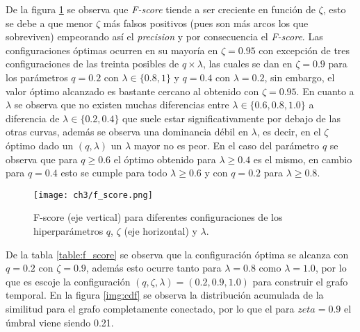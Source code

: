 \documentclass[letterpaper,12pt,oneside]{book} %
\begin{document}
De la figura \ref{img:f_score} se observa que \textit{F-score} tiende a ser creciente en función de $\zeta$, esto se debe a que menor $\zeta$ más falsos positivos (pues son más arcos los que sobreviven) empeorando así el \textit{precision} y por consecuencia el \textit{F-score}. Las configuraciones óptimas ocurren en su mayoría en $\zeta=0.95$ con excepción de tres configuraciones de las treinta posibles de $q\times \lambda$, las cuales se dan en $\zeta=0.9$ para los parámetros $q=0.2$ con $\lambda \in \{0.8, 1\}$ y $q=0.4$ con $\lambda=0.2$, sin embargo, el valor óptimo alcanzado es bastante cercano al obtenido con $\zeta=0.95$. En cuanto a $\lambda$ se observa que no existen muchas diferencias entre $\lambda\in\{0.6, 0.8, 1.0\}$ a diferencia de $\lambda \in \{0.2, 0.4\}$ que suele estar significativamente por debajo de las otras curvas, además se observa una dominancia débil en $\lambda$, es decir, en el $\zeta$ óptimo dado un $(q, \lambda)$ un $\lambda$ mayor no es peor. En el caso del parámetro $q$ se observa que para $q\geq 0.6$ el óptimo obtenido para $\lambda\geq 0.4$ es el mismo, en cambio para $q=0.4$ esto se cumple para todo $\lambda\geq 0.6$ y con $q=0.2$ para $\lambda \geq 0.8$. 

\begin{figure}
    \centering
    \texttt{[image: ch3/f\_score.png]}
    \caption{F-score (eje vertical) para diferentes configuraciones de los hiperparámetros $q$, $\zeta$ (eje horizontal) y $\lambda$.}
    \label{img:f_score}
\end{figure}

De la tabla \ref{table:f_score} se observa que la configuración óptima se alcanza con $q=0.2$ con $\zeta=0.9$, además esto ocurre tanto para $\lambda=0.8$ como $\lambda=1.0$, por lo que es escoje la configuración $(q, \zeta, \lambda) = (0.2, 0.9, 1.0)$ para construir el grafo temporal. En la figura \ref{img:cdf} se observa la distribución acumulada de la similitud para el grafo completamente conectado, por lo que el para $zeta=0.9$ el úmbral viene siendo 0.21.
\end{document}
